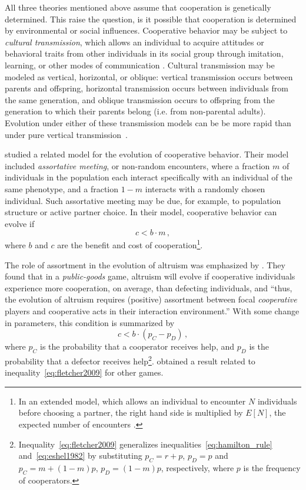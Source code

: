 \documentclass[12pt]{extarticle}
\begin{document}
All three theories mentioned above assume that cooperation is genetically determined. This raise the question, is it possible that cooperation is determined by environmental or social influences.
Cooperative behavior may be subject to \emph{cultural transmission}, which allows an individual to acquire attitudes or behavioral traits from other individuals in its social group through imitation, learning, or other modes of communication \citep{cavalli1981cultural,richerson2008not}.
Cultural transmission may be  modeled as vertical, horizontal, or oblique:  vertical transmission occurs between parents and offspring, horizontal transmission occurs between individuals from the same generation, and oblique transmission occurs  to offspring from the generation to which their parents belong (i.e. from non-parental adults). 
Evolution under either of these transmission models can be be more rapid than under pure vertical transmission~\citep{cavalli1981cultural,lycett2008questions,ram2018evolution}.


\citet{Eshel1982} studied a related model for the evolution of cooperative behavior.
Their model included \emph{assortative meeting}, or non-random encounters, where a fraction $m$ of individuals in the population each interact specifically with an individual of the same phenotype, and a fraction $1-m$ interacts  with a randomly chosen individual.  
Such assortative meeting may be due, for example, to population structure or active partner choice.
In their model, cooperative behavior can evolve if
\citep[eq.~3.2]{Eshel1982}
\begin{equation} \label{eq:eshel1982}
c < b \cdot m \,,
\end{equation}
where $b$ and $c$ are the benefit and cost of cooperation\footnote{In an extended model, which allows an individual to encounter $N$ individuals before choosing a partner, the right hand side is multiplied by $E[N]$, the expected number of encounters \citep[eq.~4.6]{Eshel1982}.
}. 

The role of assortment in the evolution of altruism was emphasized by \citet{Fletcher2009assortment}.
They found that in a \emph{public-goods} game, altruism will evolve if cooperative individuals experience more cooperation, on average, than defecting individuals, and ``thus, the evolution of altruism requires (positive) assortment between focal \emph{cooperative} players and cooperative acts in their interaction environment.''
With some change in parameters, this condition is summarized by \citep[eq.~2.3]{Fletcher2009assortment}
\begin{equation} \label{eq:fletcher2009}
c < b \cdot (p_C - p_D ) \,,
\end{equation}
where $p_C$ is the probability that a cooperator receives help, and $p_D$ is the probability that a defector receives help\footnote{Inequality~\ref{eq:fletcher2009} generalizes inequalities~\ref{eq:hamilton_rule} and~\ref{eq:eshel1982} by substituting $p_C=r + p$, $p_D=p$ and $p_C=m + (1-m)p$, $p_D=(1-m)p$, respectively, where $p$ is the frequency of cooperators.}.
\citet{Bijma2010assortment} obtained a result related to inequality~\ref{eq:fletcher2009} for other games.
\end{document}
